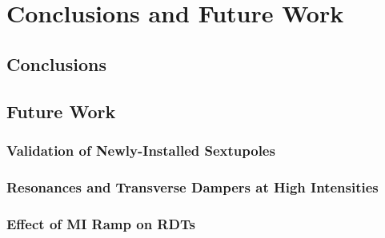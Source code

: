 \chapter{Conclusions and Future Work}
\label{sec:ch7}

\section{Conclusions}

\section{Future Work}

\subsection{Validation of Newly-Installed Sextupoles}

\subsection{Resonances and Transverse Dampers at High Intensities}

\subsection{Effect of MI Ramp on RDTs}

\cite{cris1} \cite{cris2}
